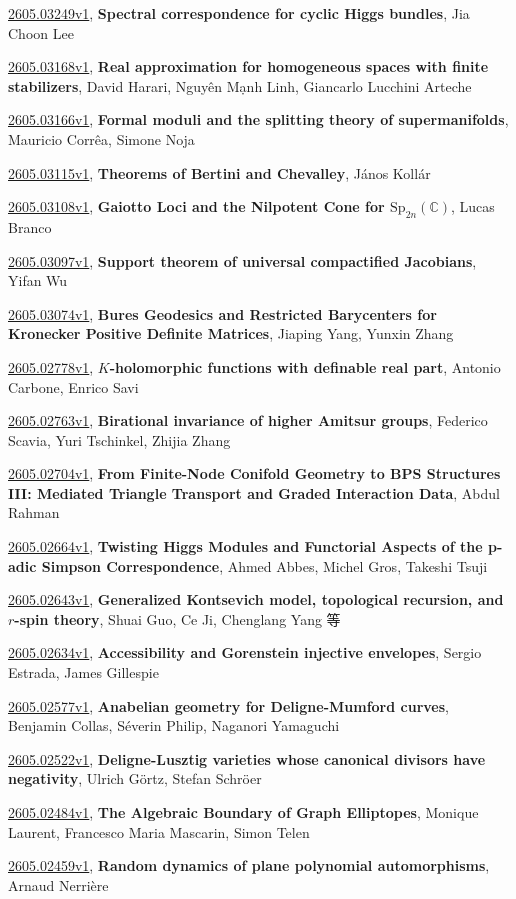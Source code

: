 \documentclass[9pt, a4paper]{article}
\theoremstyle{plain}
\theoremstyle{definition}
\theoremstyle{remark}
\newcommand{\arxiv}[3]{\href{https://arxiv.org/abs/#1}{#1}, \textbf{\textcolor{arxivblue}{#2}}, #3}
\begin{document}
\arxiv{2605.03249v1}{Spectral correspondence for cyclic Higgs bundles}{Jia Choon Lee}

\arxiv{2605.03168v1}{Real approximation for homogeneous spaces with finite stabilizers}{David Harari, Nguyên M\d{a}nh Linh, Giancarlo Lucchini Arteche}

\arxiv{2605.03166v1}{Formal moduli and the splitting theory of supermanifolds}{Mauricio Corrêa, Simone Noja}

\arxiv{2605.03115v1}{Theorems of Bertini and Chevalley}{János Kollár}

\arxiv{2605.03108v1}{Gaiotto Loci and the Nilpotent Cone for $\mathrm{Sp}_{2n}(\mathbb C)$}{Lucas Branco}

\arxiv{2605.03097v1}{Support theorem of universal compactified Jacobians}{Yifan Wu}

\arxiv{2605.03074v1}{Bures Geodesics and Restricted Barycenters for Kronecker Positive Definite Matrices}{Jiaping Yang, Yunxin Zhang}

\arxiv{2605.02778v1}{$K$-holomorphic functions with definable real part}{Antonio Carbone, Enrico Savi}

\arxiv{2605.02763v1}{Birational invariance of higher Amitsur groups}{Federico Scavia, Yuri Tschinkel, Zhijia Zhang}

\arxiv{2605.02704v1}{From Finite-Node Conifold Geometry to BPS Structures III: Mediated Triangle Transport and Graded Interaction Data}{Abdul Rahman}

\arxiv{2605.02664v1}{Twisting Higgs Modules and Functorial Aspects of the p-adic Simpson Correspondence}{Ahmed Abbes, Michel Gros, Takeshi Tsuji}

\arxiv{2605.02643v1}{Generalized Kontsevich model, topological recursion, and $r$-spin theory}{Shuai Guo, Ce Ji, Chenglang Yang 等}

\arxiv{2605.02634v1}{Accessibility and Gorenstein injective envelopes}{Sergio Estrada, James Gillespie}

\arxiv{2605.02577v1}{Anabelian geometry for Deligne-Mumford curves}{Benjamin Collas, Séverin Philip, Naganori Yamaguchi}

\arxiv{2605.02522v1}{Deligne-Lusztig varieties whose canonical divisors have negativity}{Ulrich Görtz, Stefan Schröer}

\arxiv{2605.02484v1}{The Algebraic Boundary of Graph Elliptopes}{Monique Laurent, Francesco Maria Mascarin, Simon Telen}

\arxiv{2605.02459v1}{Random dynamics of plane polynomial automorphisms}{Arnaud Nerrière}
\end{document}
